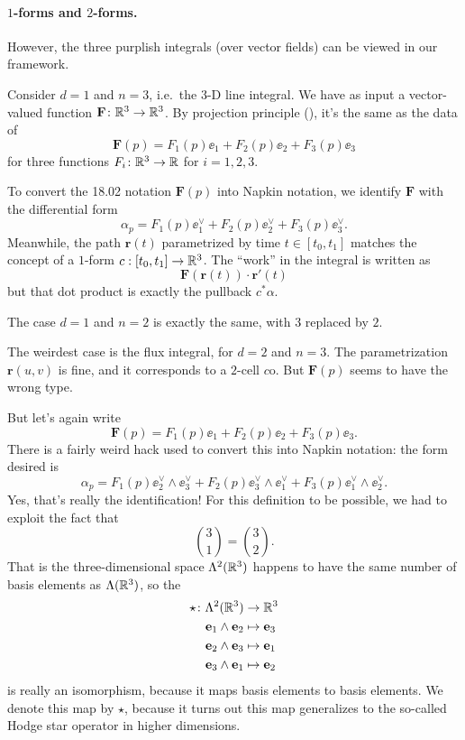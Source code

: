 \paragraph{$1$-forms and $2$-forms.}
However, the three purplish integrals (over vector fields) can be viewed in our framework.
\begin{itemize}
	\ii Consider $d = 1$ and $n = 3$, i.e.\ the 3-D line integral.
	We have as input a vector-valued function $\mathbf{F} \colon \mathbb R^3 \to \mathbb R^3$.
	By projection principle (), it's the same as the data of
	\[ \mathbf{F}(p) = F_1(p) \ee_1 + F_2(p) \ee_2 + F_3(p) \ee_3 \]
	for three functions $F_i \colon \mathbb R^3 \to \mathbb R$ for $i = 1, 2, 3$.

	To convert the 18.02 notation $\mathbf{F}(p)$ into Napkin notation,
	we identify $\mathbf{F}$ with the differential form
	\[ \alpha_p = F_1(p) \ee_1^\vee + F_2(p) \ee_2^\vee + F_3(p) \ee_3^\vee. \]
	Meanwhile, the path $\mathbf{r}(t)$ parametrized by time $t \in [t_0, t_1]$
	matches the concept of a $1$-form $c : [t_0, t_1] \to \mathbb R^3$.
	The ``work'' in the integral is written as
	\[ \mathbf F(\mathbf{r}(t)) \cdot \mathbf{r}'(t) \]
	but that dot product is exactly the pullback $c^\ast\alpha$.

	\ii The case $d = 1$ and $n = 2$ is exactly the same, with $3$ replaced by $2$.

	\ii The weirdest case is the flux integral, for $d = 2$ and $n = 3$.
	The parametrization $\mathbf{r}(u,v)$ is fine, and it corresponds to a $2$-cell $c$o.
	But $\mathbf{F}(p)$ seems to have the wrong type.

	But let's again write
	\[ \mathbf{F}(p) = F_1(p) \ee_1 + F_2(p) \ee_2 + F_3(p) \ee_3. \]
	There is a fairly weird hack used to convert this into Napkin notation: the form desired is
	\[ \alpha_p = F_1(p) \ee_2^\vee \wedge \ee_3^\vee
		+ F_2(p) \ee_3^\vee \wedge \ee_1^\vee
		+ F_3(p) \ee_1^\vee \wedge \ee_2^\vee. \]
	Yes, that's really the identification!
	For this definition to be possible, we had to exploit the fact that
	\[ \binom 31 = \binom 32. \]
	That is the three-dimensional space $\Lambda^2(\mathbb R^3)$
	happens to have the same number of basis elements as $\Lambda(\mathbb R^3)$, so the
	\begin{align*}
		\star \colon \Lambda^2(\mathbb R^3) &\to \mathbb R^3 \\
		\mathbf e_1 \wedge \mathbf e_2 &\mapsto \mathbf e_3 \\
		\mathbf e_2 \wedge \mathbf e_3 &\mapsto \mathbf e_1 \\
		\mathbf e_3 \wedge \mathbf e_1 &\mapsto \mathbf e_2
	\end{align*}
	is really an isomorphism, because it maps basis elements to basis elements.
	We denote this map by $\star$,
	because it turns out this map generalizes to the so-called Hodge star operator in higher dimensions.


\end{itemize}
